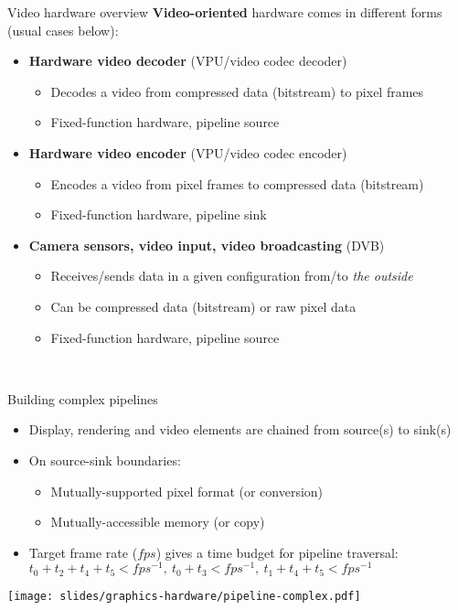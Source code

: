 \begin{frame}{Video hardware overview}
  \textbf{Video-oriented} hardware comes in different forms (usual cases below):

  \begin{itemize}
  \item \textbf{Hardware video decoder} (VPU/video codec decoder)
  \begin{itemize}
    \item Decodes a video from compressed data (bitstream) to pixel frames
    \item Fixed-function hardware, pipeline source
  \end{itemize}
  \item \textbf{Hardware video encoder} (VPU/video codec encoder)
  \begin{itemize}
    \item Encodes a video from pixel frames to compressed data (bitstream)
    \item Fixed-function hardware, pipeline sink
  \end{itemize}
  \item \textbf{Camera sensors, video input, video broadcasting} (DVB)
  \begin{itemize}
    \item Receives/sends data in a given configuration from/to \textit{the outside}
    \item Can be compressed data (bitstream) or raw pixel data
    \item Fixed-function hardware, pipeline source
  \end{itemize}
  \end{itemize}~
\end{frame}

\begin{frame}{Building complex pipelines}
  \begin{itemize}
  \item Display, rendering and video elements are chained from source(s) to sink(s)
  \item On source-sink boundaries:
    \begin{itemize}
    \item Mutually-supported pixel format (or conversion)
    \item Mutually-accessible memory (or copy)
    \end{itemize}
  \item Target frame rate (\(fps\)) gives a time budget for pipeline traversal:
  \( t_0 + t_2 + t_4 + t_5 < fps^{-1},~ t_0 + t_3 < fps^{-1},~ t_1 + t_4 + t_5 < fps^{-1} \)
  \end{itemize}

  \begin{center}
  \texttt{[image: slides/graphics-hardware/pipeline-complex.pdf]}
  \end{center}
\end{frame}

